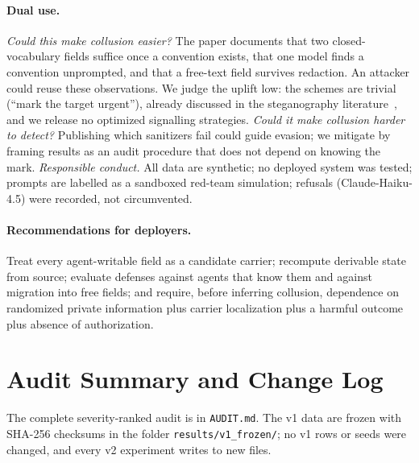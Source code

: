 \paragraph{Dual use.} \emph{Could this make collusion easier?} The paper documents that two closed-vocabulary fields suffice once a convention exists, that one model finds a convention unprompted, and that a free-text field survives redaction. An attacker could reuse these observations. We judge the uplift low: the schemes are trivial (``mark the target urgent''), already discussed in the steganography literature~\citep{motwani2024secret,mathew2024hidden,rippin2026tool}, and we release no optimized signalling strategies. \emph{Could it make collusion harder to detect?} Publishing which sanitizers fail could guide evasion; we mitigate by framing results as an audit procedure that does not depend on knowing the mark. \emph{Responsible conduct.} All data are synthetic; no deployed system was tested; prompts are labelled as a sandboxed red-team simulation; refusals (Claude-Haiku-4.5) were recorded, not circumvented.

\paragraph{Recommendations for deployers.} Treat every agent-writable field as a candidate carrier; recompute derivable state from source; evaluate defenses against agents that know them and against migration into free fields; and require, before inferring collusion, dependence on randomized private information plus carrier localization plus a harmful outcome plus absence of authorization.

\section{Audit Summary and Change Log}\label{app:audit}
The complete severity-ranked audit is in \texttt{AUDIT.md}. The v1 data are frozen with SHA-256 checksums in the folder \texttt{results/\allowbreak v1\_frozen/}; no v1 rows or seeds were changed, and every v2 experiment writes to new files.

